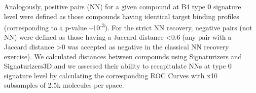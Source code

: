 Analogously, positive pairs (NN) for a given compound at B4 type 0 signature level were defined as those compounds having identical target binding profiles (corresponding to a p-value \textasciitilde10\textsuperscript{-3}). For the strict NN recovery, negative pairs (not NN) were defined as those having a Jaccard distance <0.6 (any pair with a Jaccard distance >0 was accepted as negative in the classical NN recovery exercise). We calculated distances between compounds using Signaturizers and Signaturizers3D and we assessed their ability to recapitulate NNs at type 0 signature level by calculating the corresponding ROC Curves with x10 subsamples of 2.5k molecules per space.